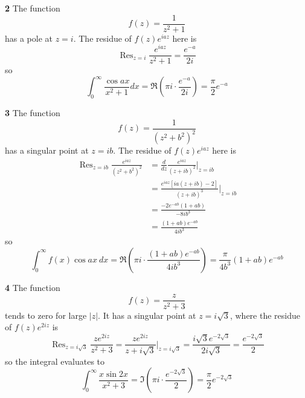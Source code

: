 \documentclass{article}
\DeclareMathOperator{\Res}{Res}
\begin{document}
\textbf{2}
The function 
\[
	f(z) = \frac{1}{z^2 + 1}
\]
has a pole at $z = i$. The residue of $f(z) e^{iaz}$ here is
\[
	\Res_{z=i} \frac{e^{iaz}}{z^2 + 1}
	= \frac{e^{-a}}{2i}
\]
so
\[
	\int_0^\infty \frac{\cos ax}{x^2 + 1} dx
	= \Re\left( \pi i \cdot \frac{e^{-a}}{2i} \right)
	= \frac{\pi}{2} e^{-a}
\]

\textbf{3}
The function
\[
	f(z) = \frac{1}{(z^2 + b^2)^2} 
\]
has a singular point at $z = ib$. The residue of $f(z) e^{iaz}$ here is
\begin{align*}
	\Res_{z = ib} \frac{e^{iaz}}{(z^2 + b^2)^2}
	&= \frac{d}{dz} \frac{e^{iaz}}{(z + ib)^2} \Big|_{z = ib} \\
	&= \frac{e^{iaz} [ia (z + ib) - 2]}{(z + ib)^3} \Big|_{z = ib} \\
	&= \frac{-2e^{-ab} (1 + ab)}{-8ib^3} \\
	&= \frac{(1 + ab)e^{-ab}}{4ib^3}
\end{align*}
so
\[
	\int_0^\infty f(x) \cos ax~dx
	= \Re \left( \pi i \cdot \frac{(1 + ab)e^{-ab}}{4ib^3} \right)
	= \frac{\pi}{4b^3} (1 + ab)e^{-ab}
\]

\textbf{4}
The function
\[
	f(z) = \frac{z}{z^2 + 3}
\]
tends to zero for large $|z|$. It has a singular point at $z = i\sqrt{3}$, where the residue of $f(z) e^{2iz}$ is
\[
	\Res_{z = i\sqrt{3}} \frac{z e^{2iz}}{z^2 + 3}
	= \frac{z e^{2iz}}{z + i\sqrt{3}} \Big|_{z = i\sqrt{3}}
	= \frac{i\sqrt{3} e^{-2\sqrt{3}}}{2i\sqrt{3}}
	= \frac{e^{-2\sqrt{3}}}{2}
\]
so the integral evaluates to
\[
	\int_0^\infty \frac{x \sin 2x}{x^2 + 3}
	= \Im \left( \pi i \cdot \frac{e^{-2\sqrt{3}}}{2} \right)
	= \frac{\pi}{2} e^{-2\sqrt{3}}
\]
\end{document}
